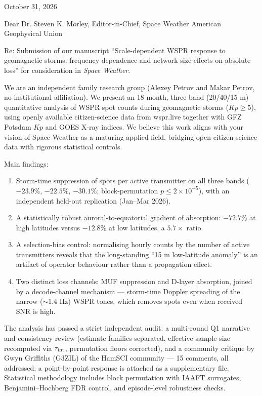 \documentclass[11pt]{article}
\begin{document}
October 31, 2026

Dear Dr. Steven K. Morley,
Editor-in-Chief, Space Weather
American Geophysical Union

Re: Submission of our manuscript ``Scale-dependent WSPR response to
geomagnetic storms: frequency dependence and network-size effects on
absolute loss'' for consideration in \emph{Space Weather}.

We are an independent family research group (Alexey Petrov and Makar
Petrov, no institutional affiliation). We present an 18-month,
three-band (20/40/15 m) quantitative analysis of WSPR spot counts
during geomagnetic storms ($Kp \ge 5$), using openly available
citizen-science data from wspr.live together with GFZ Potsdam $Kp$
and GOES X-ray indices. We believe this work aligns with your vision
of Space Weather as a maturing applied field, bridging open
citizen-science data with rigorous statistical controls.

Main findings:

\begin{enumerate}
\item Storm-time suppression of spots per active transmitter on all
three bands ($-23.9\%$, $-22.5\%$, $-30.1\%$; block-permutation
$p \le 2\times10^{-5}$), with an independent held-out replication
(Jan--Mar 2026).
\item A statistically robust auroral-to-equatorial gradient of
absorption: $-72.7\%$ at high latitudes versus $-12.8\%$ at low
latitudes, a $5.7\times$ ratio.
\item A selection-bias control: normalising hourly counts by the
number of active transmitters reveals that the long-standing
``15 m low-latitude anomaly'' is an artifact of operator behaviour
rather than a propagation effect.
\item Two distinct loss channels: MUF suppression and D-layer
absorption, joined by a decode-channel mechanism --- storm-time
Doppler spreading of the narrow ($\sim$1.4 Hz) WSPR tones, which
removes spots even when received SNR is high.
\end{enumerate}

The analysis has passed a strict independent audit: a multi-round
Q1 narrative and consistency review (estimate families separated,
effective sample size recomputed via $\tau_{\rm int}$, permutation
floors corrected), and a community critique by Gwyn Griffiths
(G3ZIL) of the HamSCI community --- 15 comments, all addressed; a
point-by-point response is attached as a supplementary file.
Statistical methodology includes block permutation with IAAFT
surrogates, Benjamini--Hochberg FDR control, and episode-level
robustness checks.
\end{document}
